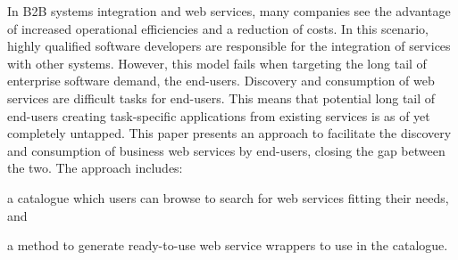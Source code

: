 
In B2B systems integration and web services, many companies see the advantage of increased operational efficiencies and a reduction of costs. 
In this scenario, highly qualified software developers are responsible for the integration of services with other systems.
However, this model fails when targeting the long tail of enterprise software demand, the end-users. 
Discovery and consumption of web services are difficult tasks for end-users. 
This means that potential long tail of end-users creating task-specific applications from existing services is as of yet completely untapped. 
This paper presents an approach to facilitate the discovery and consumption of business web services by end-users, closing the gap between the two. The approach includes: 
\begin{inparaenum}[(a)]
	\item a catalogue which users can browse to search for web services fitting their needs, and
	\item a method to generate ready-to-use web service wrappers to use in the catalogue.
\end{inparaenum}

